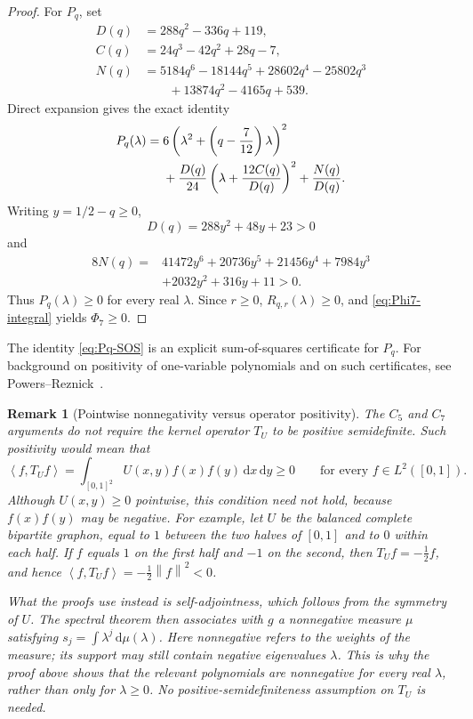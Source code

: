 \documentclass[11pt]{article}
\newtheorem{remark}[theorem]{Remark}
\numberwithin{equation}{section}
\newcommand{\ip}[2]{\left\langle #1,#2\right\rangle}
\newcommand{\norm}[1]{\left\lVert #1\right\rVert}
\newcommand{\dd}{\,\mathrm d}
\begin{document}
\begin{proof}
  For $P_q$, set
  \begin{align*}
    D(q)&=288q^2-336q+119,\\
    C(q)&=24q^3-42q^2+28q-7,\\
    N(q)&=5184q^6-18144q^5+28602q^4-25802q^3\\
    &\qquad+13874q^2-4165q+539.
  \end{align*}
  Direct expansion gives the exact identity
  \begin{align}
    P_q(\lambda)
    ={}&6\left(\lambda^2+\left(q-\frac{7}{12}\right)\lambda\right)^2 \notag\\
    &+\frac{D(q)}{24}
    \left(\lambda+\frac{12C(q)}{D(q)}\right)^2
    +\frac{N(q)}{D(q)}. \label{eq:Pq-SOS}
  \end{align}
  Writing $y=1/2-q\ge0$,
  \[
    D(q)=288y^2+48y+23>0
  \]
  and
  \begin{align*}
    8N(q)={}&41472y^6+20736y^5+21456y^4+7984y^3\\
    &+2032y^2+316y+11>0.
  \end{align*}
  Thus $P_q(\lambda)\ge0$ for every real $\lambda$.
  Since $r\ge0$, $R_{q,r}(\lambda)\ge0$, and \eqref{eq:Phi7-integral} yields $\Phi_7\ge0$.
\end{proof}

The identity \eqref{eq:Pq-SOS} is an explicit sum-of-squares certificate for $P_q$.
For background on positivity of one-variable polynomials and on such certificates, see Powers--Reznick~\cite{PowersReznick2000}.

\iffalse
\begin{remark}[Pointwise nonnegativity versus operator positivity]
  The $C_5$ and $C_7$ arguments do not require the kernel operator $T_U$ to be positive semidefinite.
  Such positivity would mean that
  \[
    \ip f{T_Uf}
    =\int_{[0,1]^2}U(x,y)f(x)f(y)\dd x\dd y\ge0
    \qquad\text{for every }f\in L^2([0,1]).
  \]
  Although $U(x,y)\ge0$ pointwise, this condition need not hold, because $f(x)f(y)$ may be negative.
  For example, let $U$ be the balanced complete bipartite graphon, equal to $1$ between the two halves of $[0,1]$ and to $0$ within each half.
  If $f$ equals $1$ on the first half and $-1$ on the second, then $T_Uf=-\tfrac{1}{2}f$, and hence $\ip f{T_Uf}=-\tfrac{1}{2}\norm f^2<0$.

  What the proofs use instead is self-adjointness, which follows from the symmetry of $U$.
  The spectral theorem then associates with $g$ a nonnegative measure $\mu$ satisfying $s_j=\int\lambda^j\dd\mu(\lambda)$.
  Here nonnegative refers to the weights of the measure; its support may still contain negative eigenvalues $\lambda$.
  This is why the proof above shows that the relevant polynomials are nonnegative for every real $\lambda$, rather than only for $\lambda\ge0$.
  No positive-semidefiniteness assumption on $T_U$ is needed.
\end{remark}
\end{document}
